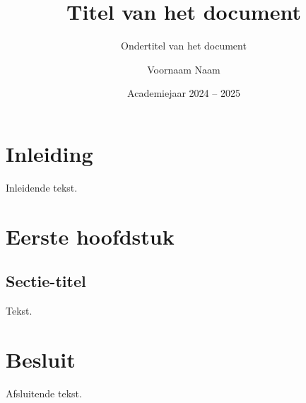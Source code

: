 \documentclass[twoside, kulak]{kulakreport} %
\title{Titel van het document}
\subtitle{Ondertitel van het document}
\author{Voornaam Naam}
\date{Academiejaar 2024 -- 2025}
\institute{Naam van de opleiding}
\begin{document}
\titlepage

\tableofcontents

\chapter*{Inleiding}
Inleidende tekst.

\chapter{Eerste hoofdstuk}
\section{Sectie-titel}
Tekst.

\chapter*{Besluit}
Afsluitende tekst.
\end{document}
